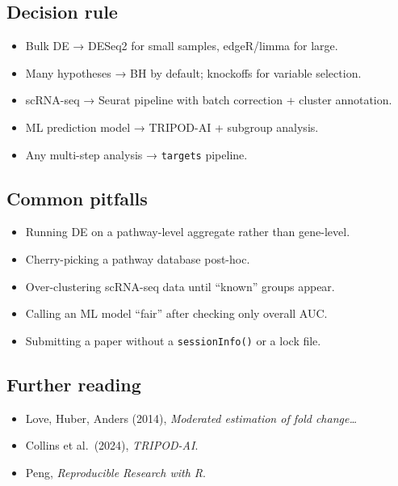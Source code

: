 \documentclass[
]{article}
\providecommand{\tightlist}{%
  \setlength{\itemsep}{0pt}\setlength{\parskip}{0pt}}
\begin{document}
\subsection{Decision rule}\label{decision-rule-15}

\begin{itemize}
\tightlist
\item
  Bulk DE → DESeq2 for small samples, edgeR/limma for large.
\item
  Many hypotheses → BH by default; knockoffs for variable selection.
\item
  scRNA-seq → Seurat pipeline with batch correction + cluster
  annotation.
\item
  ML prediction model → TRIPOD-AI + subgroup analysis.
\item
  Any multi-step analysis → \texttt{targets} pipeline.
\end{itemize}

\subsection{Common pitfalls}\label{common-pitfalls-15}

\begin{itemize}
\tightlist
\item
  Running DE on a pathway-level aggregate rather than gene-level.
\item
  Cherry-picking a pathway database post-hoc.
\item
  Over-clustering scRNA-seq data until ``known'' groups appear.
\item
  Calling an ML model ``fair'' after checking only overall AUC.
\item
  Submitting a paper without a \texttt{sessionInfo()} or a lock file.
\end{itemize}

\subsection{Further reading}\label{further-reading-15}

\begin{itemize}
\tightlist
\item
  Love, Huber, Anders (2014), \emph{Moderated estimation of fold
  change\ldots{}}
\item
  Collins et al.~(2024), \emph{TRIPOD-AI}.
\item
  Peng, \emph{Reproducible Research with R}.
\end{itemize}
\end{document}

